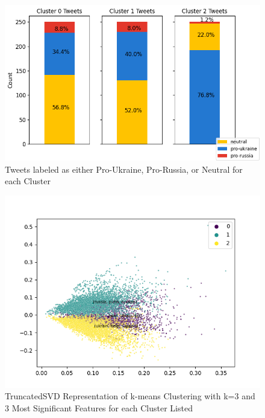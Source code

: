 \documentclass[12pt,letterpaper,oneside,titlepage]{article}
\begin{document}
\begin{figure}[ht]
    \centering
    \includegraphics[scale=0.6]{biclass-kmeans}
    \captionsetup{justification=centering}
    \caption{Tweets labeled as either Pro-Ukraine, Pro-Russia, or Neutral for each Cluster}
\end{figure}
\FloatBarrier

\begin{figure}[ht]
    \centering
    \includegraphics[scale=0.6]{truncated-svd-decomposition-clustering}
    \captionsetup{justification=centering}
    \caption{TruncatedSVD Representation of k-means Clustering with k=3 and 3 Most Significant Features for each Cluster Listed}
\end{figure}
\FloatBarrier
\end{document}
